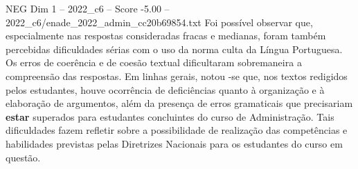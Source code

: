 \begin{textsample}{NEG Dim 1 – 2022\_c6 – Score -5.00 – 2022\_c6/enade\_2022\_admin\_cc20b69854.txt}
Foi possível observar que, especialmente nas respostas consideradas fracas e medianas, foram também percebidas dificuldades sérias com o uso da norma culta da Língua Portuguesa.
Os erros de coerência e de coesão textual dificultaram sobremaneira a compreensão das respostas.
Em linhas gerais, notou -se que, nos textos redigidos pelos estudantes, houve ocorrência de deficiências quanto à organização e à elaboração de argumentos, além da presença de erros gramaticais que precisariam \textbf{estar} superados para estudantes concluintes do curso de Administração.
Tais dificuldades fazem refletir sobre a possibilidade de realização das competências e habilidades previstas pelas Diretrizes Nacionais para os estudantes do curso em questão.

\end{textsample}
